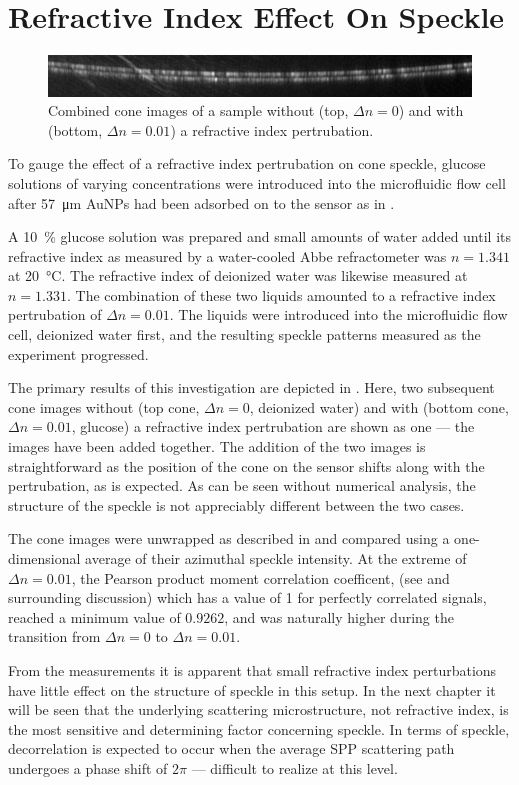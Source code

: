 \section{Refractive Index Effect On Speckle}
\begin{figure}[ht]
\centering
\includegraphics[keepaspectratio,width=15cm]{bulkri/figures/combineri.png}
\caption{Combined cone images of a sample without (top, $\Delta n = 0$) and
with (bottom, $\Delta n = 0.01$) a refractive index pertrubation. }
\label{fig:speckleridrangos}
\end{figure}

To gauge the effect of a refractive index pertrubation on cone speckle,
glucose solutions of varying concentrations were introduced into the
microfluidic flow cell after \SI{57}{\micro\meter} AuNPs had been adsorbed on
to the sensor as in .

A \SI{10}{\percent} glucose solution was prepared and small amounts of water
added until its refractive index as measured by a water-cooled Abbe
refractometer was $n=1.341$ at \SI{20}{\celsius}.  The refractive index of
deionized water was likewise measured at $n=1.331$.  The combination of these
two liquids amounted to a refractive index pertrubation of $\Delta n = 0.01$.
The liquids were introduced into the microfluidic flow cell, deionized water
first, and the resulting speckle patterns measured as the experiment
progressed.

The primary results of this investigation are depicted in
.  Here, two subsequent cone images without (top
cone, $\Delta n = 0$, deionized water) and with (bottom cone, $\Delta n =
0.01$, glucose) a refractive index pertrubation are shown as one --- the
images have been added together.  The addition of the two images is
straightforward as the position of the cone on the sensor shifts along with
the pertrubation, as is expected.  As can be seen without numerical analysis,
the structure of the speckle is not appreciably different between the two
cases.

The cone images were unwrapped as described in  and
compared using a one-dimensional average of their azimuthal speckle intensity.
At the extreme of $\Delta n = 0.01$, the Pearson product moment correlation
coefficent, (see  and surrounding
discussion) which has a value of 1 for perfectly correlated signals, reached a
minimum value of $0.9262$, and was naturally higher during the transition from
$\Delta n = 0$ to $\Delta n = 0.01$.

From the measurements it is apparent that small refractive index perturbations
have little effect on the structure of speckle in this setup.  In the next
chapter it will be seen that the underlying scattering microstructure, not
refractive index, is the most sensitive and determining factor concerning
speckle.  In terms of speckle, decorrelation is expected to occur when the
average SPP scattering path undergoes a phase shift of $2\pi$ --- difficult to
realize at this level.

